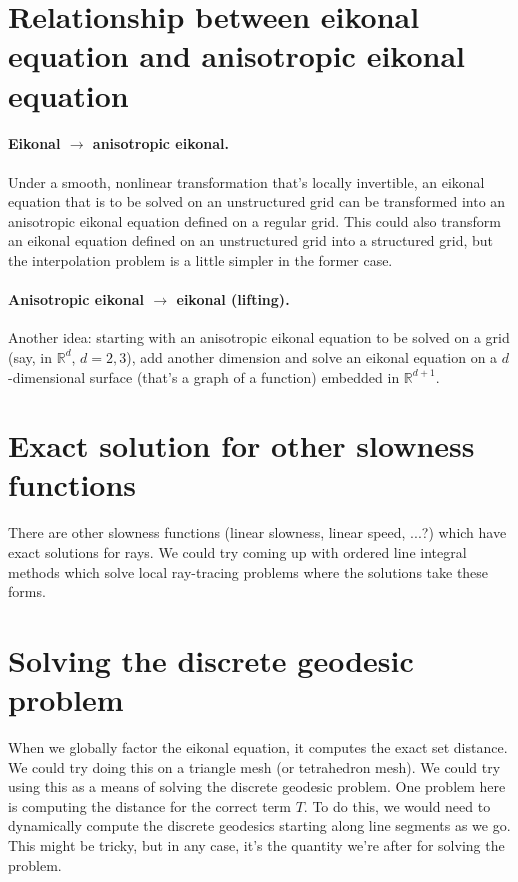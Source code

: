 \documentclass[eikonal.tex]{subfiles}
\begin{document}
\section{Relationship between eikonal equation and anisotropic eikonal
  equation}

\paragraph{Eikonal $\to$ anisotropic eikonal.} Under a smooth,
nonlinear transformation that's locally invertible, an eikonal
equation that is to be solved on an unstructured grid can be
transformed into an anisotropic eikonal equation defined on a regular
grid. This could also transform an eikonal equation defined on an
unstructured grid into a structured grid, but the interpolation
problem is a little simpler in the former case.

\paragraph{Anisotropic eikonal $\to$ eikonal (lifting).} Another idea:
starting with an anisotropic eikonal equation to be solved on a grid
(say, in $\mathbb{R}^d$, $d = 2, 3$), add another dimension and solve
an eikonal equation on a $d$-dimensional surface (that's a graph of a
function) embedded in $\mathbb{R}^{d + 1}$.

\section{Exact solution for other slowness functions}

There are other slowness functions (linear slowness, linear speed,
...?) which have exact solutions for rays. We could try coming up with
ordered line integral methods which solve local ray-tracing problems
where the solutions take these forms.

\section{Solving the discrete geodesic problem}

When we globally factor the eikonal equation, it computes the exact
set distance. We could try doing this on a triangle mesh (or
tetrahedron mesh). We could try using this as a means of solving the
discrete geodesic problem. One problem here is computing the distance
for the correct term $T$. To do this, we would need to dynamically
compute the discrete geodesics starting along line segments as we
go. This might be tricky, but in any case, it's the quantity we're
after for solving the problem.
\end{document}
